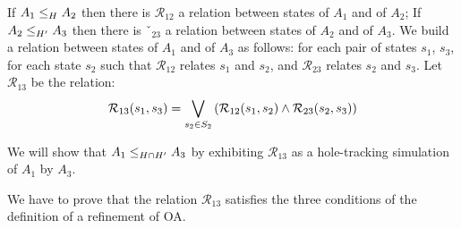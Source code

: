 \documentclass[runningheads]{llncs}
\begin{document}
\proof 
If $\wrel{A_1}{A_2}{H}$ then there is $\mathcal{R}_{12}$ a relation between states
of $A_1$ and of $A_2$;  If $\wrel{A_2}{A_3}{H'}$ then there is $ˇ_{23}$ a relation between states of $A_2$ and of $A_3$. We build a relation between
 states of $A_1$ and of $A_3$ as follows:  for each pair of states $s_1$, $s_3$, for each state $s_2$ such that $\mathcal{R}_{12}$ relates $s_1$ and $s_2$, and $\mathcal{R}_{23}$ relates $s_2$ and $s_3$.
Let $\mathcal{R}_{13}$ be the relation:\\
  \[\mathcal{R}_{13}(s_1,s_3)=\bigvee_{s_2\in S_2}\mpar{\mathcal{R}_{12}(s_1,s_2) \land \mathcal{R}_{23}(s_2,s_3) } \]

We will show that $\wrel{A_1}{A_3}{H\cap H'}$ by exhibiting  $\mathcal{R}_{13}$ as a hole-tracking simulation of $A_1$ by  $A_3$.

We have to prove that the relation $\mathcal{R}_{13}$ satisfies the three conditions of the definition of a refinement of OA.
\end{document}
